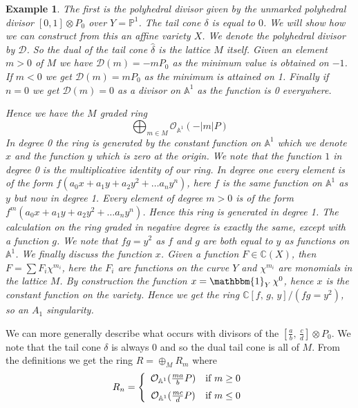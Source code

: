 \documentclass[11pt]{amsart}
\theoremstyle{plain}
\newtheorem{ex}[thm]{Example}
\newcommand{\mb}[1]{\mathbb{#1}}
\begin{document}
\begin{ex}\rm
The first is the polyhedral divisor given by the unmarked polyhedral divisor $[0, 1] \otimes P_0$ over $Y = \mb{P}^1$. 
The tail cone $\delta$ is equal to $0$. We will show how we can construct from this an affine variety $X$. We denote the polyhedral divisor by $\mathcal{D}$. So the dual of the tail cone $\hat{\delta}$ is the lattice $M$ itself. Given an element $ m >0$ of $M$ we have $\mathcal{D}(m) = -mP_0$ as the minimum value is obtained on $-1$. If $m <0$ we get $\mathcal{D}(m) = mP_0$  as the minimum is attained on 1. Finally if $n=0$ we get $\mathcal{D}(m) = 0$ as a divisor on $\mathbb{A}^1$ as the function is 0 everywhere. 


Hence we have the $M$ graded ring
\[
\bigoplus_{m \in M} \mathcal{O}_{\mathbb{A}^1}(-|m|P)
\]
In degree 0 the ring is generated by the constant function on $\mb{A}^1$ which we denote $x$ and the function $y$ which is zero at the origin. We note that the function $1$ in degree 0 is the multiplicative identity of our ring. In degree one every element is of the form $f ( a_0 x + a_1 y + a_2 y^2 + \dots  a_n y^n)$, here $f$ is the same function on $\mb{A}^1$ as $y$ but now in degree 1. Every element of degree $m>0$ is of the form $f^m ( a_0 x + a_1 y + a_2 y^2 + \dots  a_n y^n)$. Hence this ring is generated in degree 1. The calculation on the ring graded in negative degree is exactly the same, except with a function $g$.  We note that $fg = y^2$ as $f$ and $g$ are both equal to $y$ as functions on $\mb{A}^1$. We finally discuss the function $x$. Given a function $F \in \mb{C}(X)$, then $F = \sum F_i \chi^{m_i}$, here the $F_i$ are functions on the curve $Y$ and $\chi^{m_i}$ are monomials in the lattice $M$. By construction the function $x = \mathbbm{1}_{Y} \, \chi^0$, hence $x$ is the constant function on the variety. Hence we get the ring $\mathbb{C}[f,  \, g, \, y]/ (fg=y^2)$, so an $A_1$ singularity.
\end{ex}

We can more generally describe what occurs with divisors of the $[\frac{a}{b}, \, \frac{c}{d}] \otimes P_0$. We note that the tail cone $\delta$ is always 0 and so the dual tail cone is all of $M$. From the definitions we get the ring $R = \oplus_M R_m$ where
\[
R_n = 
\left\{
\begin{array}{cc}
\mathcal{O}_{\mb{A}^1} ( \frac{ma}{b}P) & \text{if } m \geq 0  \vspace{0.2cm} \\
\mathcal{O}_{\mb{A}^1} ( \frac{mc}{d}P) & \text{if } m \leq 0 
\end{array}
\right.
\]
\end{document}
